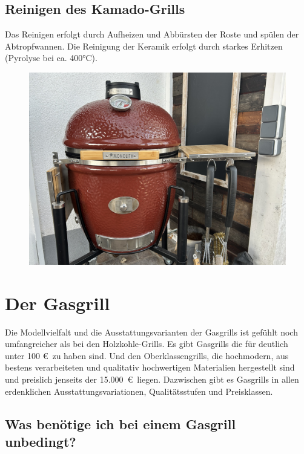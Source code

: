 \subsection{Reinigen des Kamado-Grills}

	Das Reinigen erfolgt durch Aufheizen und Abbürsten der Roste und spülen der 
	Abtropfwannen. Die 
	Reinigung der Keramik erfolgt durch starkes Erhitzen (Pyrolyse bei ca. 400°C).
	
	\begin{figure}[htbp]
		\centering
		\begin{minipage}{1\textwidth}
			\centering
			\includegraphics[width=1\linewidth]{pics/Keramikgrill}
			\label{fig:Keramikgrill}
		\end{minipage}%
	\end{figure}
\newpage
\section{Der Gasgrill}

	Die Modellvielfalt und die Ausstattungsvarianten der Gasgrills ist gefühlt noch 
	umfangreicher als bei den 
	Holzkohle-Grills. Es gibt Gasgrills die für 
	deutlich unter 100 €\ zu haben sind. Und den Oberklassengrills, die 
	hochmodern, aus bestens 
	verarbeiteten und qualitativ hochwertigen Materialien
	hergestellt sind und preislich jenseits der 15.000~€\ liegen. Dazwischen gibt es 
	Gasgrills in allen 
	erdenklichen Ausstattungsvariationen, Qualitätsstufen und Preisklassen. 
	

\subsection{Was benötige ich bei einem Gasgrill unbedingt?} 


